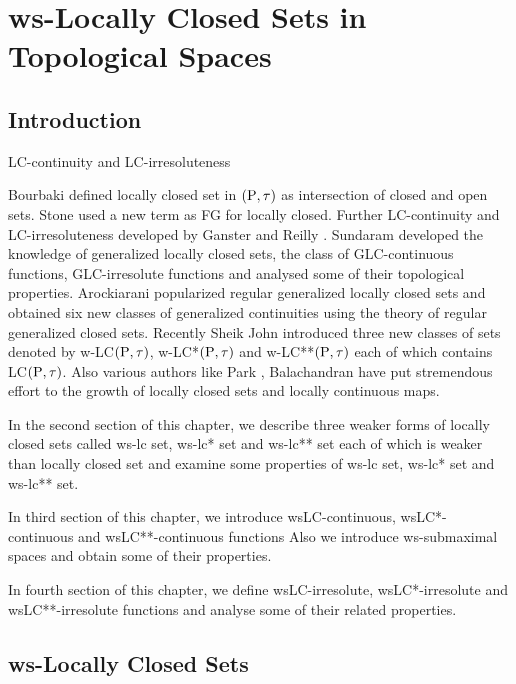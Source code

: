 \chapter{ws-Locally Closed Sets in Topological Spaces}
\graphicspath{{Chapter7/Chapter7Figs/EPS/}{Chapter7/Chapter7Figs/}}

\section{Introduction}\label{sec7.1}

LC-continuity and LC-irresoluteness

Bourbaki \cite{Bourbaki} defined locally closed set in $(\mathrm{P},\tau)$ as intersection of closed and open sets. Stone \cite{Stone} used a new term as FG for locally closed. Further LC-continuity and LC-irresoluteness developed by Ganster and Reilly \cite{Ganster}. Sundaram \cite{Sundaram} developed the knowledge of generalized locally closed sets, the class of GLC-continuous functions, GLC-irresolute functions and analysed some of their topological properties. Arockiarani \cite{Arockiarani} popularized regular generalized locally closed sets and obtained six new classes of generalized continuities using the theory of regular generalized closed sets. Recently Sheik John \cite{Sheik1} introduced three new classes of sets denoted by w-LC$(\mathrm{P}, \tau)$, w-LC{*}$(\mathrm{P}, \tau)$ and w-LC{*}{*}$(\mathrm{P}, \tau)$ each of which contains LC$(\mathrm{P}, \tau)$. Also various authors like Park \cite{Park}, Balachandran \cite{Balachandran} have put stremendous effort to the growth of locally closed sets and locally continuous maps.

In the second section of this chapter, we describe three weaker forms of locally closed sets called ws-lc set, ws-lc* set and ws-lc{*}{*} set each of which is weaker than locally closed set and examine some properties of ws-lc set, ws-lc* set and ws-lc{*}{*} set. 

\newpage

In third section of this chapter, we introduce wsLC-continuous, wsLC*-continuous and wsLC{*}{*}-continuous functions Also we introduce ws-submaximal spaces and obtain some of their properties.

In fourth section of this chapter, we define wsLC-irresolute, wsLC*-irresolute and wsLC**-irresolute functions and analyse some of their related properties.

\section{ws-Locally Closed Sets}\label{sec6.2}

